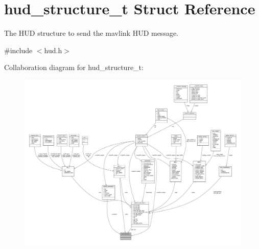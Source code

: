 \hypertarget{structhud__structure__t}{\section{hud\+\_\+structure\+\_\+t Struct Reference}
\label{structhud__structure__t}
}


The H\+U\+D structure to send the mavlink H\+U\+D message.  




{\ttfamily \#include $<$hud.\+h$>$}



Collaboration diagram for hud\+\_\+structure\+\_\+t\+:
\nopagebreak
\begin{figure}[H]
\begin{center}
\leavevmode
\includegraphics[width=350pt]{structhud__structure__t__coll__graph}
\end{center}
\end{figure}
